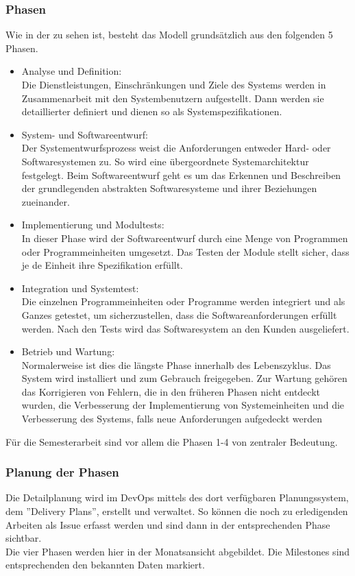 \subsubsection{Phasen}
Wie in der  zu sehen ist, besteht das Modell grundsätzlich aus den folgenden 5 Phasen.
  \begin{itemize}
      \item Analyse und Definition:\\
      Die Dienstleistungen, Einschränkungen und Ziele des Systems werden in Zusammenarbeit mit den Systembenutzern aufgestellt. Dann werden sie detaillierter  definiert und dienen so als Systemspezifikationen. 
      \item System- und Softwareentwurf:\\  Der Systementwurfsprozess weist die Anforderungen entweder Hard- oder Softwaresystemen zu. So wird eine übergeordnete Systemarchitektur festgelegt. Beim Softwareentwurf geht es um das Erkennen und Beschreiben der grundlegenden abstrakten Softwaresysteme und ihrer Beziehungen zueinander. 
      \item Implementierung und Modultests:\\  In dieser Phase wird der Softwareentwurf durch eine Menge von Programmen oder Programmeinheiten umgesetzt. Das Testen der Module stellt sicher, dass je de Einheit ihre Spezifikation erfüllt.
      \item Integration und Systemtest:\\  Die einzelnen Programmeinheiten oder Programme werden integriert und als Ganzes getestet, um sicherzustellen, dass die Softwareanforderungen erfüllt werden. Nach den Tests wird das Softwaresystem an den Kunden ausgeliefert.
      \item Betrieb und Wartung:\\ Normalerweise ist dies die längste Phase innerhalb des Lebenszyklus. Das System wird installiert und zum Gebrauch freigegeben. Zur Wartung gehören das Korrigieren von Fehlern,  die in den früheren Phasen nicht entdeckt wurden, die Verbesserung der Implementierung von Systemeinheiten und die Verbesserung des Systems, falls neue Anforderungen aufgedeckt werden
  \end{itemize}

Für die Semesterarbeit sind vor allem die Phasen 1-4 von zentraler Bedeutung.

\subsubsection{Planung der Phasen}
Die Detailplanung wird im DevOps mittels des dort verfügbaren Planungssystem, dem ''Delivery Plans'', erstellt und verwaltet. So können die noch zu erledigenden Arbeiten als Issue erfasst werden und sind dann in der entsprechenden Phase sichtbar.\\
Die vier Phasen werden hier in der Monatsansicht abgebildet. Die Milestones sind entsprechenden den bekannten Daten markiert.

